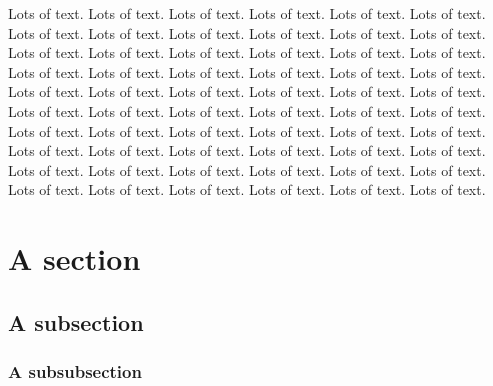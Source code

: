 \documentclass[letterpaper,10pt,oneside]{article}
\begin{document}
\maketitle
\thispagestyle{fancy}

Lots of text. Lots of text. Lots of text. Lots of text. Lots of text. Lots of text. Lots of text. Lots of text. Lots of text. Lots of text. Lots of text. Lots of text. Lots of text. Lots of text. Lots of text. Lots of text. Lots of text. Lots of text. Lots of text. Lots of text. Lots of text. Lots of text. Lots of text. Lots of text. Lots of text. Lots of text. Lots of text. Lots of text. Lots of text. Lots of text. Lots of text. Lots of text. Lots of text. Lots of text. Lots of text. Lots of text. Lots of text. Lots of text. Lots of text. Lots of text. Lots of text. Lots of text. Lots of text. Lots of text. Lots of text. Lots of text. Lots of text. Lots of text. Lots of text. Lots of text. Lots of text. Lots of text. Lots of text. Lots of text. Lots of text. Lots of text. Lots of text. Lots of text. Lots of text. Lots of text. 

\section{A section}
\subsection{A subsection}
\subsubsection{A subsubsection}
\end{document}
